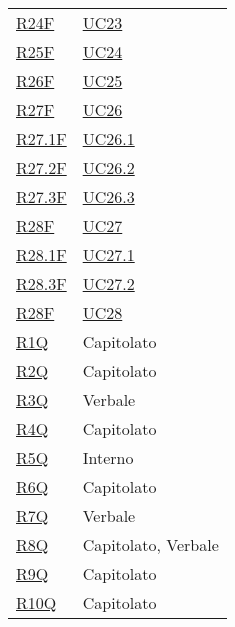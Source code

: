 \begin{center}
\begin{longtable}[!h]{p{50px} p{50px}}
        \hyperref[tab:RequisitiFunzionali]{R24F}     & \hyperref[sec:UC23]{UC23}     \\
        \hyperref[tab:RequisitiFunzionali]{R25F}     & \hyperref[sec:UC24]{UC24}     \\
        \hyperref[tab:RequisitiFunzionali]{R26F}     & \hyperref[sec:UC25]{UC25}     \\
        \hyperref[tab:RequisitiFunzionali]{R27F}     & \hyperref[sec:UC26]{UC26}     \\
        \hyperref[tab:RequisitiFunzionali]{R27.1F}   & \hyperref[sec:UC26.1]{UC26.1} \\
        \hyperref[tab:RequisitiFunzionali]{R27.2F}   & \hyperref[sec:UC26.2]{UC26.2} \\
        \hyperref[tab:RequisitiFunzionali]{R27.3F}   & \hyperref[sec:UC26.3]{UC26.3} \\
        \hyperref[tab:RequisitiFunzionali]{R28F}     & \hyperref[sec:UC27]{UC27}     \\
        \hyperref[tab:RequisitiFunzionali]{R28.1F}   & \hyperref[sec:UC27.1]{UC27.1} \\
        \hyperref[tab:RequisitiFunzionali]{R28.3F}   & \hyperref[sec:UC27.2]{UC27.2} \\
        \hyperref[tab:RequisitiFunzionali]{R28F}     & \hyperref[sec:UC28]{UC28}     \\

        \hyperref[tab:RequisitiQualita]{R1Q}         & Capitolato                    \\
        \hyperref[tab:RequisitiQualita]{R2Q}         & Capitolato                    \\
        \hyperref[tab:RequisitiQualita]{R3Q}         & Verbale                       \\
        \hyperref[tab:RequisitiQualita]{R4Q}         & Capitolato                    \\
        \hyperref[tab:RequisitiQualita]{R5Q}         & Interno                       \\
        \hyperref[tab:RequisitiQualita]{R6Q}         & Capitolato                    \\
        \hyperref[tab:RequisitiQualita]{R7Q}         & Verbale                       \\
        \hyperref[tab:RequisitiQualita]{R8Q}         & Capitolato, Verbale                       \\
        \hyperref[tab:RequisitiQualita]{R9Q}         & Capitolato                    \\
        \hyperref[tab:RequisitiQualita]{R10Q}         & Capitolato                    \\


\end{longtable}
\end{center}
